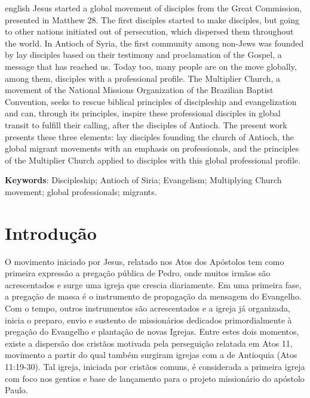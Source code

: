 \documentclass[12pt,openright,oneside,a4paper,
english,french,spanish,brazil]{abntex2}
\begin{document}
\begin{resumo}[Abstract] 
\begin{otherlanguage*}{english}
	Jesus started a global movement of disciples from the Great Commission, presented in Matthew 28. The first disciples started to make disciples, but going to other nations initiated out of persecution, which dispersed them throughout the world. In Antioch of Syria, the first community among non-Jews was founded by lay disciples based on their testimony and proclamation of the Gospel, a message that has reached us. Today too, many people are on the move globally, among them, disciples with a professional profile. The Multiplier Church, a movement of the National Missions Organization of the Brazilian Baptist Convention, seeks to rescue biblical principles of discipleship and evangelization and can, through its principles, inspire these professional disciples in global transit to fulfill their calling, after the disciples of Antioch. The present work presents these three elements: lay disciples founding the church of Antioch, the global migrant movements with an emphasis on professionals, and the principles of the Multiplier Church applied to disciples with this global professional profile.

\vspace{\onelineskip} 

\noindent \textbf{Keywords}: Discipleship; Antioch of Siria; Evangelism; Multiplying Church movement; global professionals; migrants.
\end{otherlanguage*} 
\end{resumo} 


\tableofcontents* %


\chapter*{Introdução}

O movimento iniciado por Jesus, relatado nos Atos dos Apóstolos tem como primeira expressão a pregação pública de Pedro, onde muitos irmãos são acrescentados e surge uma igreja que crescia diariamente. Em uma primeira fase, a pregação de massa é o instrumento de propagação da mensagem do Evangelho. Com o tempo, outros instrumentos são acrescentados e a igreja já organizada, inicia o preparo, envio e sustento de missionários dedicados primordialmente à pregação do Evangelho e plantação de novas Igrejas. Entre estes dois momentos, existe a dispersão dos cristãos motivada pela perseguição relatada em Atos 11, movimento a partir do qual também surgiram igrejas com a de Antioquia (Atos 11:19-30). Tal igreja, iniciada por cristãos comuns, é considerada a primeira igreja com foco nos gentios e base de lançamento para o projeto missionário do apóstolo Paulo.
	
\end{document}
